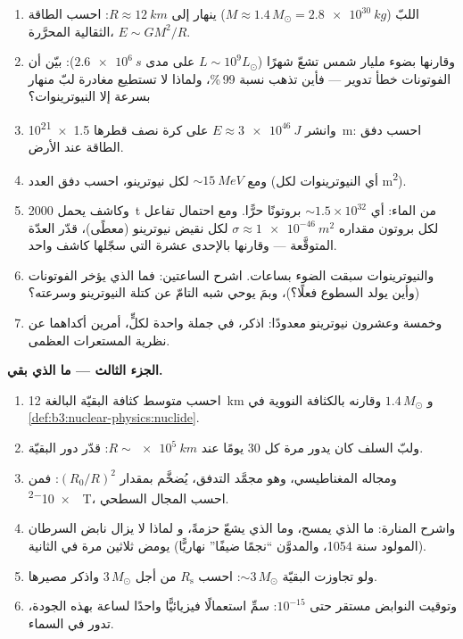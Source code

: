 \begin{problem}
\begin{enumerate}[resume]
  \item اللبّ ($M \approx 1.4\,M_\odot = \qty{2.8e30}{kg}$)
        ينهار إلى $R \approx \qty{12}{km}$: احسب
        الطاقة الثقالية المحرَّرة، $E \sim GM^2/R$.
  \item وقارنها بضوء مليار شمس تشعّ
        شهرًا ($L \sim 10^{9}L_\odot$ على مدى $\qty{2.6e6}{s}$):
        بيّن أن الفوتونات خطأ تدوير --- فأين تذهب
        نسبة 99\,\%، ولماذا لا تستطيع مغادرة لبّ منهار
        بسرعة إلا النيوترينوات؟
  \item وانشر $E \approx \qty{3e46}{J}$ على كرة نصف قطرها
        \qty{1.5e21}{m}: احسب دفق الطاقة عند
        الأرض.
  \item ومع $\sim\qty{15}{MeV}$ لكل نيوترينو، احسب
        دفق العدد (أي النيوترينوات لكل \unit{m^2}).
  \item وكاشف يحمل \qty{2000}{t} من الماء:
        أي ${\sim}1.5\times10^{32}$ بروتونًا حرًّا. ومع
        احتمال تفاعل لكل بروتون مقداره
        $\sigma \approx \qty{1e-46}{m^2}$ لكل نقيض نيوترينو
        (معطًى)، قدّر العدّة المتوقَّعة --- وقارنها
        بالإحدى عشرة التي سجّلها كاشف واحد.
  \item والنيوترينوات سبقت الضوء بساعات. اشرح
        الساعتين: فما الذي يؤخر الفوتونات (وأين يولد
        السطوع فعلًا؟)، وبمَ يوحي 
        شبه التامّ عن كتلة النيوترينو وسرعته؟
  \item وخمسة وعشرون نيوترينو معدودًا: اذكر، في جملة واحدة
        لكلٍّ، أمرين أكداهما عن نظرية المستعرات العظمى.
\end{enumerate}

\medskip\noindent\textbf{الجزء الثالث --- ما الذي بقي.}

\begin{enumerate}[resume]
  \item احسب متوسط كثافة البقيّة البالغة \qty{12}{km} و
        $1.4\,M_\odot$ وقارنه بالكثافة النووية في
        \cref{def:b3:nuclear-physics:nuclide}.
  \item ولبّ السلف كان يدور مرة كل 30 يومًا عند
        $R \sim \qty{e5}{km}$: قدّر دور البقيّة.
  \item ومجاله المغناطيسي، وهو مجمَّد التدفق، يُضخَّم بمقدار
        $(R_0/R)^2$: فمن \qty{e-2}{T}، احسب المجال
        السطحي.
  \item واشرح المنارة: ما الذي يمسح، وما الذي يشعّ حزمةً، و
        لماذا لا يزال نابض السرطان (المولود سنة 1054، والمدوَّن ``نجمًا
        ضيفًا'' نهاريًّا) يومض ثلاثين مرة في الثانية.
  \item ولو تجاوزت البقيّة ${\sim}3\,M_\odot$: احسب
        $R_{\text{s}}$ من أجل $3\,M_\odot$ واذكر مصيرها.
  \item وتوقيت النوابض مستقر حتى $10^{-15}$: سمِّ استعمالًا
        فيزيائيًّا واحدًا لساعة بهذه الجودة، تدور في السماء.
\end{enumerate}


\end{problem}
